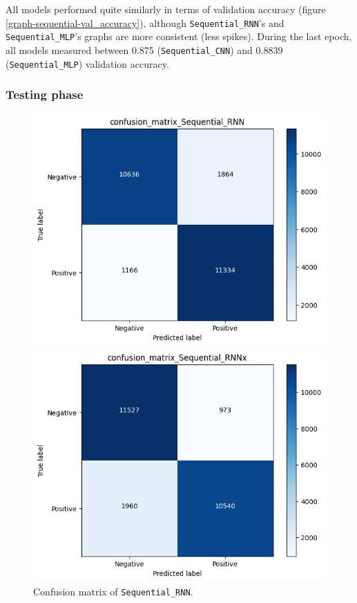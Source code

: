 All models performed quite similarly in terms of validation accuracy (figure \ref{graph-sequential-val_accuracy}),
although \texttt{Sequential\_RNN}'s and \texttt{Sequential\_MLP}'s graphs are more consistent (less spikes).
During the last epoch, all models measured between 0.875 (\texttt{Sequential\_CNN}) and 0.8839
(\texttt{Sequential\_MLP}) validation accuracy.


\subsubsection{Testing phase}
\begin{figure}[!h]
    \centering
    \begin{minipage}{0.48\textwidth}
        \centering
        \captionsetup{justification=centering}
        \includegraphics[width=\linewidth]{obrazky-figures/Sequential_experiment/confusion_matrix_Sequential_RNN_2023-04-07_16:57:21.png}
        \caption{Confusion matrix of \texttt{Sequential\_RNN}.}
        \label{graph-sequential-cm-rnn}
    \end{minipage}\hfill
    \begin{minipage}{0.48\textwidth}
        \centering
        \captionsetup{justification=centering}
        \includegraphics[width=\linewidth]{obrazky-figures/Sequential_experiment/confusion_matrix_Sequential_RNNx_2023-04-07_16:57:33.png}

\end{minipage}
\end{figure}
